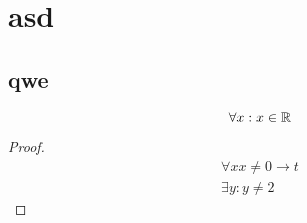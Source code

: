 \documentclass[main]{subfiles}
\begin{document}
\chapter{asd}
\section{qwe}
\begin{corollary}
    \[ \forall x : x \in \mathbb{R} \]
\end{corollary}
\begin{proof}
    \begin{gather}
        \forall x x \ne 0 \rightarrow t  \tag{1}\\
        \exists y: y \ne 2 \tag{2}
    \end{gather}
\end{proof}
\end{document}
